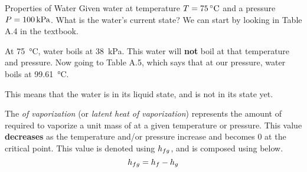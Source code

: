 \begin{example}{Properties of Water}
  Given water at temperature $\Temp = \SI{75}{\degreeCelsius}$ and a pressure $P = \SI{100}{\kilo\pascal}$.
  What is the water's current state?
  \tcblower{}
  We can start by looking in Table A.4 in the textbook.

  At \SI{75}{\degreeCelsius}, water boils at \SI{38}{\kilo\pascal}.
  This water will \textbf{not} boil at that temperature and pressure.
  Now going to Table A.5, which says that at our pressure, water boils at \SI{99.61}{\degreeCelsius}.

  This means that the water is in its liquid state, and is not in its  state yet.
\end{example}

\begin{definition}\label{def:Enthalpy_Vaporization}
  The \emph{ of vaporization} (or \emph{latent heat of vaporization}) represents the amount of  required to vaporize a unit mass of  at a given temperature or pressure.
  This value \textbf{decreases} as the temperature and/or pressure increase and becomes $0$ at the critical point.
  This value is denoted using $h_{fg}$, and is composed using  below.
  \begin{equation}\label{eq:Enthalpy_Vaporization}
    h_{fg} = h_{f} - h_{g}
  \end{equation}
\end{definition}





